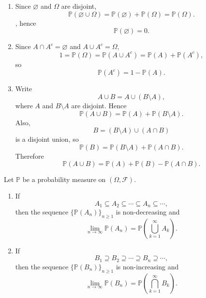 \begin{proofenv}
    \begin{enumerate}[label=(\arabic*)]
        \item Since $\varnothing$ and $\Omega$ are disjoint,
        \[
            \mathbb{P}(\varnothing\cup\Omega)=\mathbb{P}(\varnothing)+\mathbb{P}(\Omega)=\mathbb{P}(\Omega).
        \]
        , hence
        \[
            \mathbb{P}(\varnothing)=0.
        \]

        \item Since $A\cap A^c=\varnothing$ and $A\cup A^c=\Omega$,
        \[
            1=\mathbb{P}(\Omega)=\mathbb{P}(A\cup A^c)=\mathbb{P}(A)+\mathbb{P}(A^c),
        \]
        so
        \[
            \mathbb{P}(A^c)=1-\mathbb{P}(A).
        \]

        \item Write
        \[
            A\cup B=A\cup(B\setminus A),
        \]
        where $A$ and $B\setminus A$ are disjoint. Hence
        \[
            \mathbb{P}(A\cup B)=\mathbb{P}(A)+\mathbb{P}(B\setminus A).
        \]
        Also,
        \[
            B=(B\setminus A)\cup(A\cap B)
        \]
        is a disjoint union, so
        \[
            \mathbb{P}(B)=\mathbb{P}(B\setminus A)+\mathbb{P}(A\cap B).
        \]
        Therefore
        \[
            \mathbb{P}(A\cup B)=\mathbb{P}(A)+\mathbb{P}(B)-\mathbb{P}(A\cap B).
        \]
    \end{enumerate}
\end{proofenv}

\begin{propositionenv}
    Let $\mathbb{P}$ be a probability measure on $(\Omega,\mathcal{F})$.

    \begin{enumerate}[label=(\roman*)]
        \item If
        \[
            A_1 \subseteq A_2 \subseteq \cdots \subseteq A_n \subseteq \cdots,
        \]
        then the sequence $\{\mathbb{P}(A_n)\}_{n\ge 1}$ is non-decreasing and
        \[
            \lim_{n\to\infty}\mathbb{P}(A_n)
            =
            \mathbb{P}\left(\bigcup_{k=1}^{\infty} A_k\right).
        \]

        \item If
        \[
            B_1 \supseteq B_2 \supseteq \cdots \supseteq B_n \supseteq \cdots,
        \]
        then the sequence $\{\mathbb{P}(B_n)\}_{n\ge 1}$ is non-increasing and
        \[
            \lim_{n\to\infty}\mathbb{P}(B_n)
            =
            \mathbb{P}\left(\bigcap_{k=1}^{\infty} B_k\right).
        \]
    \end{enumerate}
\end{propositionenv}


